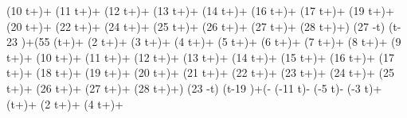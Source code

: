    \left(10 t+\right)+ \sin \left(11 t+\right)+
   \sin \left(12 t+\right)+ \sin \left(13
   t+\right)+ \sin \left(14 t+\right)+ \sin
   \left(16 t+\right)+ \sin \left(17 t+\right)+
   \sin \left(19 t+\right)+ \sin \left(20
   t+\right)+ \sin \left(22 t+\right)+ \sin
   \left(24 t+\right)+ \sin \left(25 t+\right)+
   \sin \left(26 t+\right)+ \sin \left(27
   t+\right)+ \sin \left(28 t+\right)+\right)
   \theta (27 \pi -t) \theta (t-23 \pi )+\left(55 \sin \left(t+\right)+
   \sin \left(2 t+\right)+ \sin \left(3
   t+\right)+ \sin \left(4 t+\right)+ \sin
   \left(5 t+\right)+ \sin \left(6 t+\right)+ \sin
   \left(7 t+\right)+ \sin \left(8 t+\right)+
   \sin \left(9 t+\right)+ \sin \left(10
   t+\right)+ \sin \left(11 t+\right)+ \sin
   \left(12 t+\right)+ \sin \left(13 t+\right)+
   \sin \left(14 t+\right)+ \sin \left(15
   t+\right)+ \sin \left(16 t+\right)+ \sin
   \left(17 t+\right)+ \sin \left(18 t+\right)+
   \sin \left(19 t+\right)+ \sin \left(20
   t+\right)+ \sin \left(21 t+\right)+ \sin
   \left(22 t+\right)+ \sin \left(23 t+\right)+
   \sin \left(24 t+\right)+ \sin \left(25
   t+\right)+ \sin \left(26 t+\right)+ \sin
   \left(27 t+\right)+ \sin \left(28
   t+\right)+\right) \theta (23 \pi -t) \theta (t-19 \pi
   )+\left(- \sin \left(-11 t\right)- \sin
   \left(-5 t\right)- \sin \left(-3 t\right)+
   \sin \left(t+\right)+ \sin \left(2
   t+\right)+ \sin \left(4 t+\right)+ \sin
